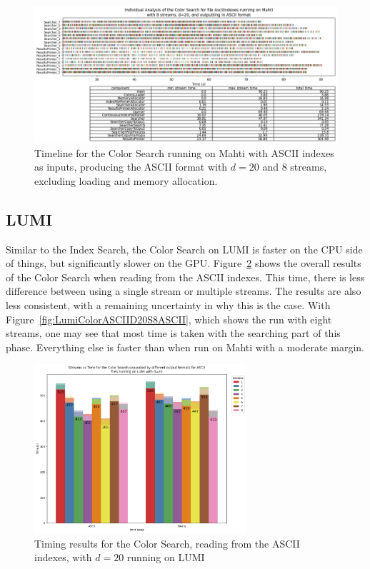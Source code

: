 \begin{figure}[t]
  \centering
  \includegraphics[width=\textwidth]{images/MahtiColorASCIID20S8ASCII.png}
  \caption{Timeline for the Color Search running on Mahti with ASCII indexes as inputs, producing the ASCII format with $d=20$ and 8 streams, excluding loading and memory allocation.}\label{fig:MahtiColorASCIID20S8ASCII}
\end{figure}

\subsection{LUMI}

Similar to the Index Search, the Color Search on LUMI is faster on the CPU side of things, but significantly slower on the GPU.
Figure~\ref{fig:LumiColorASCIID20} shows the overall results of the Color Search when reading from the ASCII indexes.
This time, there is less difference between using a single stream or multiple streams.
The results are also less consistent, with a remaining uncertainty in why this is the case.
With Figure~\ref{fig:LumiColorASCIID20S8ASCII}, which shows the run with eight streams, one may see that most time is taken with the searching part of this phase.
Everything else is faster than when run on Mahti with a moderate margin.

\begin{figure}[t]
  \centering
  \includegraphics[width=0.7\textwidth]{images/LumiColorASCIID20.png}
  \caption{Timing results for the Color Search, reading from the ASCII indexes, with $d=20$ running on LUMI}\label{fig:LumiColorASCIID20}
\end{figure}

